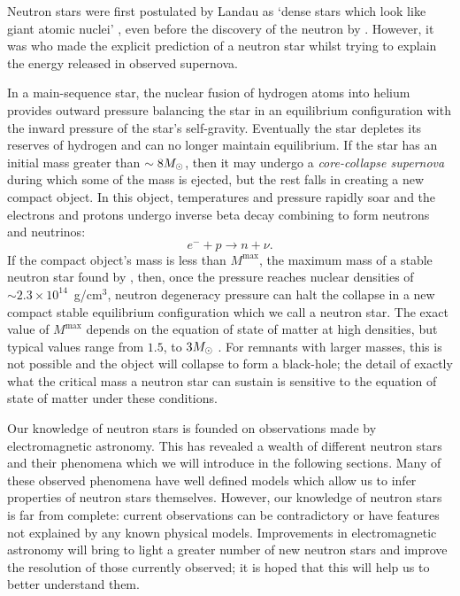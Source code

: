 \documentclass[../full_thesis/full_thesis.tex]{subfiles}
\begin{document}
 

Neutron stars were first postulated by Landau as `dense stars
which look like giant atomic nuclei' \citep{Yakovlev2013}, even before the
discovery of the neutron by \citet{Chadwick1932}. However, it was
\citet{Baade1934} who made the explicit prediction of a neutron star whilst
trying to explain the energy released in observed supernova.

In a main-sequence star, the nuclear fusion of
hydrogen atoms into helium provides outward pressure balancing the star in an
equilibrium configuration with the inward pressure of the star's self-gravity.
Eventually the star depletes its reserves of hydrogen and can no longer
maintain equilibrium. If the star has an initial mass greater than $\sim 8
M_{\odot}$, then it may undergo a \emph{core-collapse supernova} during which some
of the mass is ejected, but the rest falls in creating a new compact object.
In this object, temperatures and pressure rapidly soar and the
electrons and protons undergo inverse beta decay combining to form neutrons and
neutrinos:
\begin{equation}
    e^{-} + p \rightarrow n + \nu.
\end{equation}
If the compact object's mass is less than $M^{\textrm{max}}$, the maximum
mass of a stable neutron star found by \citet{oppenheimer1939massive},
then, once the pressure
reaches nuclear densities of $\sim 2.3 \times10^{14}$~g/cm$^{3}$, neutron
degeneracy pressure can halt the collapse in a new compact stable equilibrium
configuration which we call a neutron star. The exact value of $M^{\textrm{max}}$
depends on the equation of state of matter at high densities, but typical values
range from $1.5$, to $3 M_{\odot}$ \citep{bombaci1996}.
For remnants with larger masses,
this is not possible and the object will collapse to form a black-hole; the
detail of exactly what the critical mass a neutron star can sustain is
sensitive to the equation of state of matter under these conditions.

Our knowledge of neutron stars is founded on observations made by
electromagnetic astronomy. This has revealed a wealth of different neutron
stars and their phenomena which we will introduce in the following sections.
Many of these observed phenomena have well defined models which allow us to
infer properties of neutron stars themselves.
However, our knowledge of neutron stars is far from complete: current
observations can be contradictory or have features not explained by any known
physical models. Improvements in electromagnetic astronomy will bring to light
a greater number of new neutron stars and improve the resolution of those
currently observed; it is hoped that this will help us to better understand them.
\end{document}

